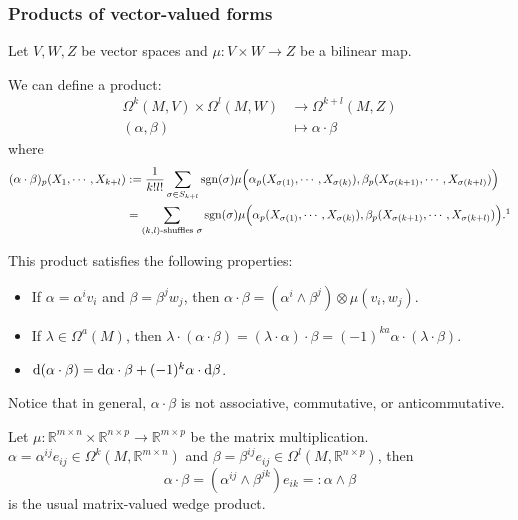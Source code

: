 \subsubsection*{Products of vector-valued forms}
Let $V,W,Z$ be vector spaces and $\mu: V\times W\to Z$ be a bilinear map. 
\begin{definition}
    We can define a product:
    \begin{align*}
        \Omega^k(M,V)\times \Omega^l(M,W) &\to \Omega^{k+l}(M,Z) \\
        (\alpha,\beta) &\mapsto \alpha\cdot \beta
    \end{align*}
    where
    \begin{align*}
        (\alpha\cdot \beta)_p(X_1,\cdots,X_{k+l}) &:= \frac{1}{k!l!}\sum_{\sigma\in S_{k+l}} \mathrm{sgn}(\sigma)\mu\Big(\alpha_p(X_{\sigma(1)},\cdots,X_{\sigma(k)}),\beta_p(X_{\sigma(k+1)},\cdots,X_{\sigma(k+l)})\Big) \\
        &= \sum_{(k,l)\text{-shuffles }\sigma} \mathrm{sgn}(\sigma)\mu\Big(\alpha_p(X_{\sigma(1)},\cdots,X_{\sigma(k)}),\beta_p(X_{\sigma(k+1)},\cdots,X_{\sigma(k+l)})\Big). \footnotemark
    \end{align*}
\end{definition}
\begin{proposition}
    This product satisfies the following properties:
    \begin{itemize}
        \item If $\alpha=\alpha^iv_i$ and $\beta=\beta^jw_j$, then
        $\alpha\cdot \beta = (\alpha^i\wedge \beta^j)\otimes \mu(v_i,w_j)$.
        \item If $\lambda\in\Omega^a(M)$, then
        $\lambda\cdot (\alpha\cdot \beta) = (\lambda\cdot \alpha)\cdot \beta = (-1)^{ka}\alpha\cdot (\lambda\cdot \beta)$.
        \item ${\rm d}(\alpha\cdot \beta) = {\rm d}\alpha\cdot \beta + (-1)^{k} \alpha\cdot {\rm d}\beta$.
    \end{itemize}
\end{proposition}

Notice that in general, $\alpha\cdot \beta$ is not associative, commutative, or anticommutative. 

\begin{example}
    Let $\mu:\mathbb{R}^{m\times n}\times \mathbb{R}^{n\times p}\to \mathbb{R}^{m\times p}$ be the matrix multiplication. 
    $\alpha=\alpha^{ij}e_{ij}\in \Omega^k(M,\mathbb{R}^{m\times n})$ and $\beta=\beta^{ij}e_{ij}\in \Omega^l(M,\mathbb{R}^{n\times p})$, then
    \begin{equation*}
        \alpha\cdot \beta = (\alpha^{ij}\wedge \beta^{jk})e_{ik} =: \alpha\wedge \beta
    \end{equation*}
    is the usual matrix-valued wedge product.
\end{example}

